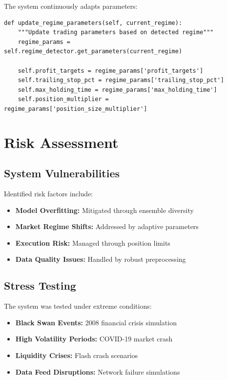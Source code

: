 \documentclass[11pt,a4paper]{article}
\begin{document}
The system continuously adapts parameters:

\begin{lstlisting}[caption=Adaptive Parameter Updates]
def update_regime_parameters(self, current_regime):
    """Update trading parameters based on detected regime"""
    regime_params = self.regime_detector.get_parameters(current_regime)

    self.profit_targets = regime_params['profit_targets']
    self.trailing_stop_pct = regime_params['trailing_stop_pct']
    self.max_holding_time = regime_params['max_holding_time']
    self.position_multiplier = regime_params['position_size_multiplier']
\end{lstlisting}

\section{Risk Assessment}

\subsection{System Vulnerabilities}

Identified risk factors include:

\begin{itemize}
    \item \textbf{Model Overfitting:} Mitigated through ensemble diversity
    \item \textbf{Market Regime Shifts:} Addressed by adaptive parameters
    \item \textbf{Execution Risk:} Managed through position limits
    \item \textbf{Data Quality Issues:} Handled by robust preprocessing
\end{itemize}

\subsection{Stress Testing}

The system was tested under extreme conditions:

\begin{itemize}
    \item \textbf{Black Swan Events:} 2008 financial crisis simulation
    \item \textbf{High Volatility Periods:} COVID-19 market crash
    \item \textbf{Liquidity Crises:} Flash crash scenarios
    \item \textbf{Data Feed Disruptions:} Network failure simulations
\end{itemize}
\end{document}

